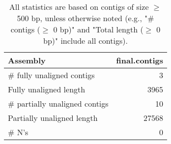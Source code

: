 \documentclass[12pt,a4paper]{article}
\begin{document}
\begin{table}[ht]
\begin{center}
\caption{All statistics are based on contigs of size $\geq$ 500 bp, unless otherwise noted (e.g., "\# contigs ($\geq$ 0 bp)" and "Total length ($\geq$ 0 bp)" include all contigs).}
\begin{tabular}{|l*{1}{|r}|}
\hline
Assembly & final.contigs \\ \hline
\# fully unaligned contigs & 3 \\ \hline
Fully unaligned length & 3965 \\ \hline
\# partially unaligned contigs & 10 \\ \hline
Partially unaligned length & 27568 \\ \hline
\# N's & 0 \\ \hline
\end{tabular}
\end{center}
\end{table}
\end{document}
